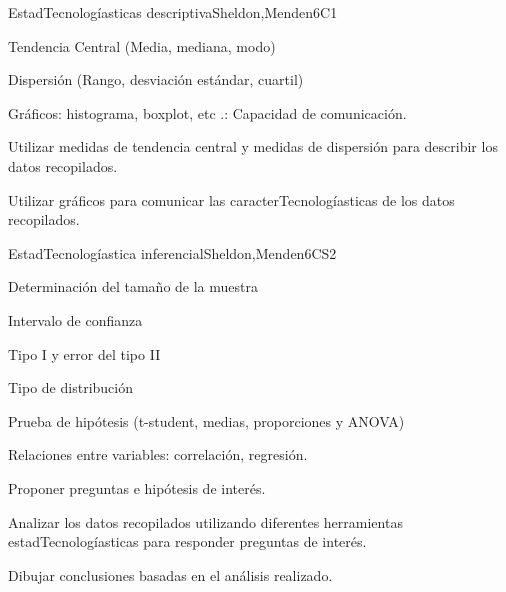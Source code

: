 \begin{syllabus}
\begin{unit}{EstadTecnologíasticas descriptiva}{}{Sheldon,Menden}{6}{C1}
\begin{topics}
      \item Tendencia Central (Media, mediana, modo)
      \item Dispersión (Rango, desviación estándar, cuartil)
      \item Gráficos: histograma, boxplot, etc .: Capacidad de comunicación.
   \end{topics}
   \begin{learningoutcomes}
      \item Utilizar medidas de tendencia central y medidas de dispersión para describir los datos recopilados.
      \item Utilizar gráficos para comunicar las caracterTecnologíasticas de los datos recopilados.
   \end{learningoutcomes}
\end{unit}

\begin{unit}{EstadTecnologíastica inferencial}{}{Sheldon,Menden}{6}{CS2}
\begin{topics}
      \item Determinación del tamaño de la muestra
      \item Intervalo de confianza
      \item Tipo I y error del tipo II
      \item Tipo de distribución
      \item Prueba de hipótesis (t-student, medias, proporciones y ANOVA)
      \item Relaciones entre variables: correlación, regresión.
   \end{topics}

   \begin{learningoutcomes}
      \item Proponer preguntas e hipótesis de interés.
      \item Analizar los datos recopilados utilizando diferentes herramientas estadTecnologíasticas para responder preguntas de interés.
      \item Dibujar conclusiones basadas en el análisis realizado.
   \end{learningoutcomes}
\end{unit}





\begin{coursebibliography}
\end{coursebibliography}

\end{syllabus}
